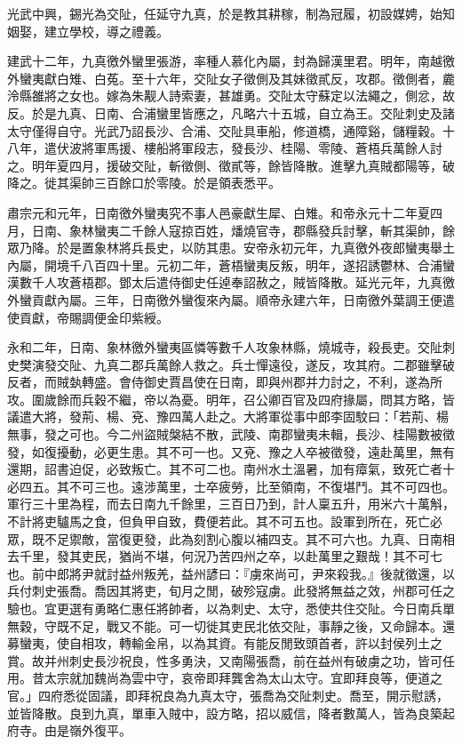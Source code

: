 \begin{pinyinscope}
光武中興，錫光為交阯，任延守九真，於是教其耕稼，制為冠履，初設媒娉，始知姻娶，建立學校，導之禮義。

建武十二年，九真徼外蠻里張游，率種人慕化內屬，封為歸漢里君。明年，南越徼外蠻夷獻白雉、白菟。至十六年，交阯女子徵側及其妹徵貳反，攻郡。徵側者，麊泠縣雒將之女也。嫁為朱觏人詩索妻，甚雄勇。交阯太守蘇定以法繩之，側忿，故反。於是九真、日南、合浦蠻里皆應之，凡略六十五城，自立為王。交阯刺史及諸太守僅得自守。光武乃詔長沙、合浦、交阯具車船，修道橋，通障谿，儲糧穀。十八年，遣伏波將軍馬援、樓船將軍段志，發長沙、桂陽、零陵、蒼梧兵萬餘人討之。明年夏四月，援破交阯，斬徵側、徵貳等，餘皆降散。進擊九真賊都陽等，破降之。徙其渠帥三百餘口於零陵。於是領表悉平。

肅宗元和元年，日南徼外蠻夷究不事人邑豪獻生犀、白雉。和帝永元十二年夏四月，日南、象林蠻夷二千餘人寇掠百姓，燔燒官寺，郡縣發兵討擊，斬其渠帥，餘眾乃降。於是置象林將兵長史，以防其患。安帝永初元年，九真徼外夜郎蠻夷舉土內屬，開境千八百四十里。元初二年，蒼梧蠻夷反叛，明年，遂招誘鬱林、合浦蠻漢數千人攻蒼梧郡。鄧太后遣侍御史任逴奉詔赦之，賊皆降散。延光元年，九真徼外蠻貢獻內屬。三年，日南徼外蠻復來內屬。順帝永建六年，日南徼外葉調王便遣使貢獻，帝賜調便金印紫綬。

永和二年，日南、象林徼外蠻夷區憐等數千人攻象林縣，燒城寺，殺長吏。交阯刺史樊演發交阯、九真二郡兵萬餘人救之。兵士憚遠役，遂反，攻其府。二郡雖擊破反者，而賊埶轉盛。會侍御史賈昌使在日南，即與州郡并力討之，不利，遂為所攻。圍歲餘而兵穀不繼，帝以為憂。明年，召公卿百官及四府掾屬，問其方略，皆議遣大將，發荊、楊、兗、豫四萬人赴之。大將軍從事中郎李固駮曰：「若荊、楊無事，發之可也。今二州盜賊槃結不散，武陵、南郡蠻夷未輯，長沙、桂陽數被徵發，如復擾動，必更生患。其不可一也。又兗、豫之人卒被徵發，遠赴萬里，無有還期，詔書迫促，必致叛亡。其不可二也。南州水土溫暑，加有瘴氣，致死亡者十必四五。其不可三也。遠涉萬里，士卒疲勞，比至領南，不復堪鬥。其不可四也。軍行三十里為程，而去日南九千餘里，三百日乃到，計人稟五升，用米六十萬斛，不計將吏驢馬之食，但負甲自致，費便若此。其不可五也。設軍到所在，死亡必眾，既不足禦敵，當復更發，此為刻割心腹以補四支。其不可六也。九真、日南相去千里，發其吏民，猶尚不堪，何況乃苦四州之卒，以赴萬里之艱哉！其不可七也。前中郎將尹就討益州叛羌，益州諺曰：『虜來尚可，尹來殺我。』後就徵還，以兵付刺史張喬。喬因其將吏，旬月之閒，破殄寇虜。此發將無益之效，州郡可任之驗也。宜更選有勇略仁惠任將帥者，以為刺史、太守，悉使共住交阯。今日南兵單無穀，守既不足，戰又不能。可一切徙其吏民北依交阯，事靜之後，又命歸本。還募蠻夷，使自相攻，轉輸金帛，以為其資。有能反閒致頭首者，許以封侯列土之賞。故并州刺史長沙祝良，性多勇決，又南陽張喬，前在益州有破虜之功，皆可任用。昔太宗就加魏尚為雲中守，哀帝即拜龔舍為太山太守。宜即拜良等，便道之官。」四府悉從固議，即拜祝良為九真太守，張喬為交阯刺史。喬至，開示慰誘，並皆降散。良到九真，單車入賊中，設方略，招以威信，降者數萬人，皆為良築起府寺。由是嶺外復平。


\end{pinyinscope}
